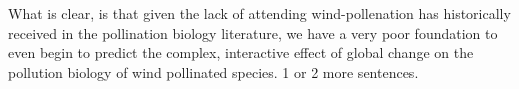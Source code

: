 \documentclass[12pt]{article}
\begin{document}
What is clear, is that given the lack of attending wind-pollenation has historically received in the pollination biology literature, we have a very poor foundation to even begin to predict the complex, interactive effect of global change on the pollution biology of wind pollinated species. 1 or 2 more sentences.



 
\end{document}
